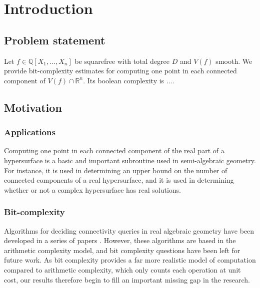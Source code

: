 \documentclass[sigconf]{acmart}
\def\R{\mathbb{R}}
\begin{document}



\maketitle
%
%
%
%
%
\section{Introduction}
%
%
%
\subsection{Problem statement}
Let $f \in \mathbb{Q}[X_1,\hdots,X_n]$ be squarefree with total degree $D$ and $V(f)$ smooth. We provide bit-complexity estimates for computing one point in each connected component of $V(f)\cap \R^n.$ Its boolean complexity is $\hdots$.
%
%
%
%
\subsection{Motivation}
\subsubsection{Applications}
Computing one point in each connected component of the real part of a hypersurface is a basic and important subroutine used in semi-algebraic geometry. For instance, it is used in determining an upper bound on the number of connected components of a real hypersurface, and it is used in determining whether or not a complex hypersurface has real solutions. 
\subsubsection{Bit-complexity}
Algorithms for deciding connectivity queries in real algebraic geometry have been developed in a series of papers \cite{a,b,c,d}. However, these algorithms are based in the arithmetic complexity model, and bit complexity questions have been left for future work. As bit complexity provides a far more realistic model of computation compared to arithmetic complexity,  which only counts each operation at unit cost, our results therefore begin to fill an important missing gap in the research. 
\end{document}
